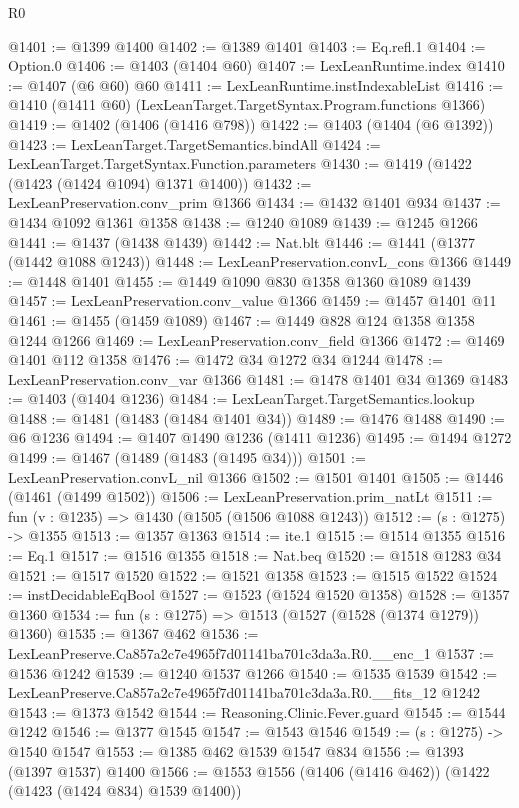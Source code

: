 \begin{lexlean}{R0}
\begin{coremodule}
@1401 := @1399 @1400
@1402 := @1389 @1401
@1403 := Eq.refl.{1}
@1404 := Option.{0}
@1406 := @1403 (@1404 @60)
@1407 := LexLeanRuntime.index
@1410 := @1407 (@6 @60) @60
@1411 := LexLeanRuntime.instIndexableList
@1416 := @1410 (@1411 @60) (LexLeanTarget.TargetSyntax.Program.functions @1366)
@1419 := @1402 (@1406 (@1416 @798))
@1422 := @1403 (@1404 (@6 @1392))
@1423 := LexLeanTarget.TargetSemantics.bindAll
@1424 := LexLeanTarget.TargetSyntax.Function.parameters
@1430 := @1419 (@1422 (@1423 (@1424 @1094) @1371 @1400))
@1432 := LexLeanPreservation.conv_prim @1366
@1434 := @1432 @1401 @934
@1437 := @1434 @1092 @1361 @1358
@1438 := @1240 @1089
@1439 := @1245 @1266
@1441 := @1437 (@1438 @1439)
@1442 := Nat.blt
@1446 := @1441 (@1377 (@1442 @1088 @1243))
@1448 := LexLeanPreservation.convL_cons @1366
@1449 := @1448 @1401
@1455 := @1449 @1090 @830 @1358 @1360 @1089 @1439
@1457 := LexLeanPreservation.conv_value @1366
@1459 := @1457 @1401 @11
@1461 := @1455 (@1459 @1089)
@1467 := @1449 @828 @124 @1358 @1358 @1244 @1266
@1469 := LexLeanPreservation.conv_field @1366
@1472 := @1469 @1401 @112 @1358
@1476 := @1472 @34 @1272 @34 @1244
@1478 := LexLeanPreservation.conv_var @1366
@1481 := @1478 @1401 @34 @1369
@1483 := @1403 (@1404 @1236)
@1484 := LexLeanTarget.TargetSemantics.lookup
@1488 := @1481 (@1483 (@1484 @1401 @34))
@1489 := @1476 @1488
@1490 := @6 @1236
@1494 := @1407 @1490 @1236 (@1411 @1236)
@1495 := @1494 @1272
@1499 := @1467 (@1489 (@1483 (@1495 @34)))
@1501 := LexLeanPreservation.convL_nil @1366
@1502 := @1501 @1401
@1505 := @1446 (@1461 (@1499 @1502))
@1506 := LexLeanPreservation.prim_natLt
@1511 := fun (v : @1235) => @1430 (@1505 (@1506 @1088 @1243))
@1512 := (s : @1275) -> @1355
@1513 := @1357 @1363
@1514 := ite.{1}
@1515 := @1514 @1355
@1516 := Eq.{1}
@1517 := @1516 @1355
@1518 := Nat.beq
@1520 := @1518 @1283 @34
@1521 := @1517 @1520
@1522 := @1521 @1358
@1523 := @1515 @1522
@1524 := instDecidableEqBool
@1527 := @1523 (@1524 @1520 @1358)
@1528 := @1357 @1360
@1534 := fun (s : @1275) => @1513 (@1527 (@1528 (@1374 @1279)) @1360)
@1535 := @1367 @462
@1536 := LexLeanPreserve.Ca857a2c7e4965f7d01141ba701c3da3a.R0.__enc_1
@1537 := @1536 @1242
@1539 := @1240 @1537 @1266
@1540 := @1535 @1539
@1542 := LexLeanPreserve.Ca857a2c7e4965f7d01141ba701c3da3a.R0.__fits_12 @1242
@1543 := @1373 @1542
@1544 := Reasoning.Clinic.Fever.guard
@1545 := @1544 @1242
@1546 := @1377 @1545
@1547 := @1543 @1546
@1549 := (s : @1275) -> @1540 @1547
@1553 := @1385 @462 @1539 @1547 @834
@1556 := @1393 (@1397 @1537) @1400
@1566 := @1553 @1556 (@1406 (@1416 @462)) (@1422 (@1423 (@1424 @834) @1539 @1400))

\end{coremodule}
\end{lexlean}
